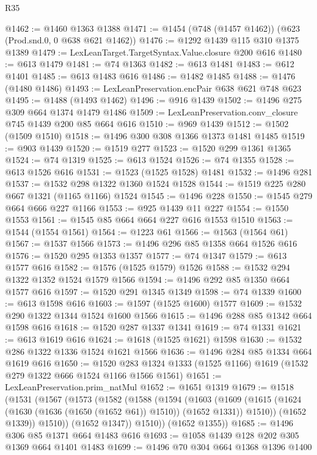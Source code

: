 \begin{lexlean}{R35}
\begin{coremodule}
@1462 := @1460 @1363 @1388
@1471 := @1454 (@748 (@1457 @1462)) (@623 (Prod.snd.{0, 0} @638 @621 @1462))
@1476 := @1292 @1439 @115 @310 @1375 @1389
@1479 := LexLeanTarget.TargetSyntax.Value.closure @200 @616
@1480 := @613 @1479
@1481 := @74 @1363
@1482 := @613 @1481
@1483 := @612 @1401
@1485 := @613 @1483 @616
@1486 := @1482 @1485
@1488 := @1476 (@1480 @1486)
@1493 := LexLeanPreservation.encPair @638 @621 @748 @623
@1495 := @1488 (@1493 @1462)
@1496 := @916 @1439
@1502 := @1496 @275 @309 @664 @1374 @1479 @1486
@1509 := LexLeanPreservation.conv_closure @745 @1439 @200 @85 @664 @616
@1510 := @969 @1439
@1512 := @1502 (@1509 @1510)
@1518 := @1496 @300 @308 @1366 @1373 @1481 @1485
@1519 := @903 @1439
@1520 := @1519 @277
@1523 := @1520 @299 @1361 @1365
@1524 := @74 @1319
@1525 := @613 @1524
@1526 := @74 @1355
@1528 := @613 @1526 @616
@1531 := @1523 (@1525 @1528) @1481
@1532 := @1496 @281
@1537 := @1532 @298 @1322 @1360 @1524 @1528
@1544 := @1519 @225 @280 @667 @1321 (@1165 @1166) @1524
@1545 := @1496 @228
@1550 := @1545 @279 @664 @666 @227 @1166
@1553 := @925 @1439 @11 @227
@1554 := @1550 @1553
@1561 := @1545 @85 @664 @664 @227 @616 @1553 @1510
@1563 := @1544 (@1554 @1561)
@1564 := @1223 @61
@1566 := @1563 (@1564 @61)
@1567 := @1537 @1566
@1573 := @1496 @296 @85 @1358 @664 @1526 @616
@1576 := @1520 @295 @1353 @1357
@1577 := @74 @1347
@1579 := @613 @1577 @616
@1582 := @1576 (@1525 @1579) @1526
@1588 := @1532 @294 @1322 @1352 @1524 @1579 @1566
@1594 := @1496 @292 @85 @1350 @664 @1577 @616
@1597 := @1520 @291 @1345 @1349
@1598 := @74 @1339
@1600 := @613 @1598 @616
@1603 := @1597 (@1525 @1600) @1577
@1609 := @1532 @290 @1322 @1344 @1524 @1600 @1566
@1615 := @1496 @288 @85 @1342 @664 @1598 @616
@1618 := @1520 @287 @1337 @1341
@1619 := @74 @1331
@1621 := @613 @1619 @616
@1624 := @1618 (@1525 @1621) @1598
@1630 := @1532 @286 @1322 @1336 @1524 @1621 @1566
@1636 := @1496 @284 @85 @1334 @664 @1619 @616
@1650 := @1520 @283 @1324 @1333 (@1525 @1166) @1619 (@1532 @279 @1322 @666 @1524 @1166 @1566 @1561)
@1651 := LexLeanPreservation.prim_natMul
@1652 := @1651 @1319
@1679 := @1518
    (@1531
      (@1567
        (@1573
          (@1582
            (@1588
              (@1594
                (@1603
                  (@1609
                    (@1615 (@1624 (@1630 (@1636 (@1650 (@1652 @61)) @1510)) (@1652 @1331)) @1510))
                  (@1652 @1339))
                @1510))
            (@1652 @1347))
          @1510))
      (@1652 @1355))
@1685 := @1496 @306 @85 @1371 @664 @1483 @616
@1693 := @1058 @1439 @128 @202 @305 @1369 @664 @1401 @1483
@1699 := @1496 @70 @304 @664 @1368 @1396 @1400

\end{coremodule}
\end{lexlean}
